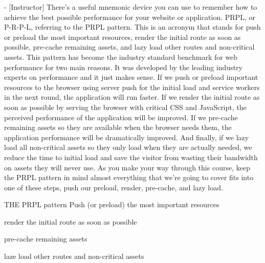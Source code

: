 - [Instructor] There's a useful mnemonic device you can use to remember how to 
achieve the best possible performance for your website or application. PRPL, or 
P-R-P-L, referring to the PRPL pattern. This is an acronym that stands for push or
preload the most important resources, render the initial route as soon as possible, 
pre-cache remaining assets, and lazy load other routes and non-critical assets. 
This pattern has become the industry standard benchmark for web performance for two
main reasons. It was developed by the leading industry experts on performance and 
it just makes sense. If we push or preload important resources to the browser using
server push for the initial load and service workers in the next round, the 
application will run faster. If we render the initial route as soon as possible by 
serving the browser with critical CSS and JavaScript, the perceived performance of
the application will be improved. If we pre-cache remaining assets so they are 
available when the browser needs them, the application performance will be 
dramatically improved. And finally, if we lazy load all non-critical assets so 
they only load when they are actually needed, we reduce the time to initial load
and save the visitor from wasting their bandwidth on assets they will never use.
As you make your way through this course, keep the PRPL pattern in mind 
almost everything that we're going to cover fits into one of these steps, push
our preload, render, pre-cache, and lazy load.


THE PRPL pattern 
  Push (or preload) the most important resources 

  render the initial route as soon as possible 

  pre-cache remaining assets 

  laze load other routes and non-critical assets 